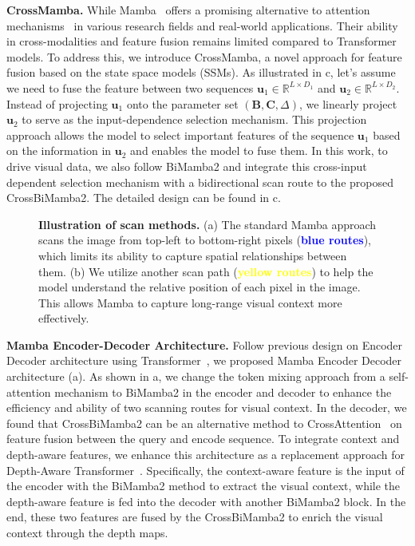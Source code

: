 \noindent\textbf{CrossMamba.} While Mamba~\cite{mamba,mamba2} offers a promising alternative to attention mechanisms~\cite{attention} in various research fields and real-world applications. Their ability in cross-modalities and feature fusion remains limited compared to Transformer models. To address this, we introduce CrossMamba, a novel approach for feature fusion based on the state space models (SSMs). As illustrated in c, let's assume we need to fuse the feature between two sequences $\mathbf{u}_1\in \mathbb{R}^{L\times D_1}$ and $\mathbf{u}_2 \in \mathbb{R}^{L\times D_2}$. Instead of projecting $\mathbf{u}_1$ onto the parameter set $\left(\mathbf{B}, \mathbf{C}, \Delta\right)$, we linearly project $\mathbf{u}_2$ to serve as the input-dependence selection mechanism. This projection approach allows the model to select important features of the sequence $\mathbf{u}_1$ based on the information in $\mathbf{u}_2$ and enables the model to fuse them. In this work, to drive visual data, we also follow BiMamba2 and integrate this cross-input dependent selection mechanism with a bidirectional scan route to the proposed CrossBiMamba2. The detailed design can be found in c.

\begin{figure}[h!]
    \centering
    
    \caption{\textbf{Illustration of scan methods.} (a) The standard Mamba approach scans the image from top-left to bottom-right pixels (\textbf{\textcolor{blue}{blue routes}}), which limits its ability to capture spatial relationships between them. (b) We utilize another scan path (\textbf{\textcolor{yellow}{yellow routes}}) to help the model understand the relative position of each pixel in the image. This allows Mamba to capture long-range visual context more effectively.}
    \label{fig:BidirectionalMamba}
\end{figure}

\noindent\textbf{Mamba Encoder-Decoder Architecture.} Follow previous design on Encoder Decoder architecture using Transformer~\cite{attention}, we proposed Mamba Encoder Decoder architecture (a). As shown in a, we change the token mixing approach from a self-attention mechanism to BiMamba2 in the encoder and decoder to enhance the efficiency and ability of two scanning routes for visual context. In the decoder, we found that CrossBiMamba2 can be an alternative method to CrossAttention~\cite{attention} on feature fusion between the query and encode sequence. To integrate context and depth-aware features, we enhance this architecture as a replacement approach for Depth-Aware Transformer~\cite{MonoDTR}. Specifically, the context-aware feature is the input of the encoder with the BiMamba2 method to extract the visual context, while the depth-aware feature is fed into the decoder with another BiMamba2 block. In the end, these two features are fused by the CrossBiMamba2 to enrich the visual context through the depth maps.

